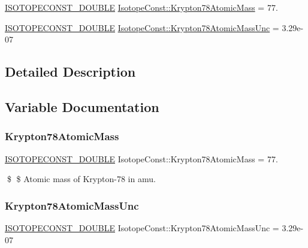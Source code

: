 \begin{DoxyCompactItemize}
\item 
\mbox{\hyperlink{group___isotope_const-_macros_ga8f45a7272ce02c0b4c65c44636ed719a}{I\+S\+O\+T\+O\+P\+E\+C\+O\+N\+S\+T\+\_\+\+D\+O\+U\+B\+LE}} \mbox{\hyperlink{group___isotope_const-_krypton-_kr78_gafb303ca345a4b7b01e31f8064b77d3c8}{Isotope\+Const\+::\+Krypton78\+Atomic\+Mass}} = 77.
\item 
\mbox{\hyperlink{group___isotope_const-_macros_ga8f45a7272ce02c0b4c65c44636ed719a}{I\+S\+O\+T\+O\+P\+E\+C\+O\+N\+S\+T\+\_\+\+D\+O\+U\+B\+LE}} \mbox{\hyperlink{group___isotope_const-_krypton-_kr78_ga11b4fcdff596012e4d79bccc22822d5e}{Isotope\+Const\+::\+Krypton78\+Atomic\+Mass\+Unc}} = 3.\+29e-\/07
\end{DoxyCompactItemize}


\subsection{Detailed Description}


\subsection{Variable Documentation}
\mbox{\label{group___isotope_const-_krypton-_kr78_gafb303ca345a4b7b01e31f8064b77d3c8}} 
\subsubsection{\texorpdfstring{Krypton78\+Atomic\+Mass}{Krypton78AtomicMass}}
{\footnotesize\ttfamily \mbox{\hyperlink{group___isotope_const-_macros_ga8f45a7272ce02c0b4c65c44636ed719a}{I\+S\+O\+T\+O\+P\+E\+C\+O\+N\+S\+T\+\_\+\+D\+O\+U\+B\+LE}} Isotope\+Const\+::\+Krypton78\+Atomic\+Mass = 77.}

\$ \$ Atomic mass of Krypton-\/78 in amu. \mbox{\label{group___isotope_const-_krypton-_kr78_ga11b4fcdff596012e4d79bccc22822d5e}} 
\subsubsection{\texorpdfstring{Krypton78\+Atomic\+Mass\+Unc}{Krypton78AtomicMassUnc}}
{\footnotesize\ttfamily \mbox{\hyperlink{group___isotope_const-_macros_ga8f45a7272ce02c0b4c65c44636ed719a}{I\+S\+O\+T\+O\+P\+E\+C\+O\+N\+S\+T\+\_\+\+D\+O\+U\+B\+LE}} Isotope\+Const\+::\+Krypton78\+Atomic\+Mass\+Unc = 3.\+29e-\/07}


